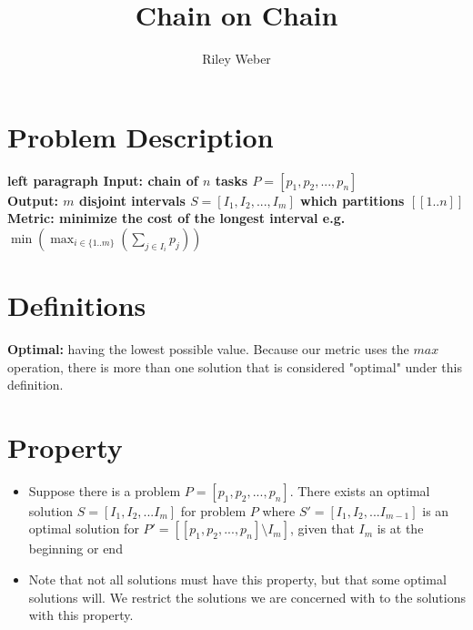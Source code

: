 \documentclass{article}
\author{Riley Weber}
\title{Chain on Chain}
\begin{document}
\maketitle

\section{Problem Description}

\begin{tabbing}
	\bfseries left \quad \quad \quad \=\bfseries paragraph \kill
	\textbf{Input:}  \> chain of $n$ tasks $P = [p_1, p_2, ..., p_n]$
	\\
	\textbf{Output:} \> $m$ disjoint intervals  $S = [I_1, I_2, ..., I_m]$ which
	partitions $[[1..n]]$ 
	\\
	\textbf{Metric:} \> minimize the cost of the longest interval e.g. 
	\\
	\>$\min(\max_{i\in\{1..m\}}(\sum_{j \in{I_i}} p_j))$ 
\end{tabbing}

\section{Definitions}
\textbf{Optimal:} having the lowest possible value. Because our metric uses the
$max$ operation, there is more than one solution that is considered "optimal"
under this definition.

\section{Property}
\begin{itemize}
\item Suppose there is a problem $P = [p_1, p_2, ..., p_n]$. There exists an
optimal solution $S = [I_1, I_2, ... I_m]$ for problem $P$ 
where $S' = [I_1, I_2, ... I_{m-1}]$ is an optimal solution for 
$P' = [[p_1, p_2, ..., p_n] \setminus I_m]$, given that $I_m$ is at the
beginning or end 
\item Note that not all solutions must have this property, but that some
optimal solutions will. We restrict the solutions we are concerned with to the
solutions with this property. 
\end{itemize}
\end{document}
